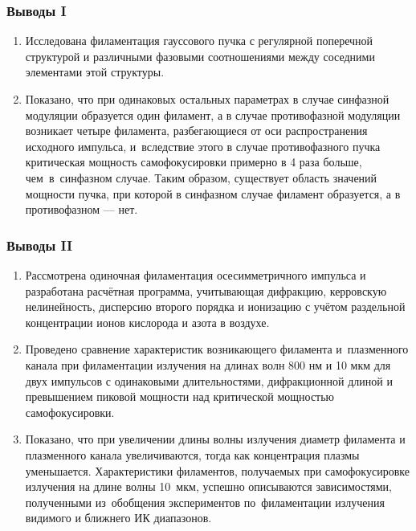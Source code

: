 \documentclass[fullscreen=true,unicode,bookmarks=true]{beamer}
\begin{document}
	\begin{frame}
		\frametitle{Выводы I}
		
        \begin{enumerate}
			\item Исследована филаментация гауссового пучка с регулярной поперечной структурой
                  и различными фазовыми соотношениями между соседними элементами этой структуры.
			\item Показано, что при одинаковых остальных параметрах в случае синфазной модуляции
                  образуется один филамент, а в случае противофазной модуляции
                  возникает четыре филамента, разбегающиеся от оси распространения исходного
                  импульса, и~вследствие этого в случае противофазного пучка критическая
                  мощность самофокусировки примерно в 4 раза больше, чем~в~синфазном случае.
                  Таким образом, существует область значений мощности пучка, при которой
                  в синфазном случае филамент образуется, а в противофазном --- нет.
		\end{enumerate}
	\end{frame}
	
	\begin{frame}
		\frametitle{Выводы II}
		
        \begin{enumerate}
			\item Рассмотрена одиночная филаментация осесимметричного импульса
			      и разработана расчётная программа,
			      учитывающая дифракцию, керровскую нелинейность, дисперсию второго порядка и ионизацию
			      с учётом раздельной концентрации ионов кислорода и азота в воздухе.
			\item Проведено сравнение характеристик возникающего филамента и~плазменного канала при филаментации излучения
			      на длинах волн 800 нм и 10 мкм для двух импульсов с одинаковыми длительностями, дифракционной длиной
			      и превышением пиковой мощности над критической мощностью самофокусировки.
			\item Показано, что при увеличении длины волны излучения диаметр филамента и плазменного канала увеличиваются,
			      тогда как концентрация плазмы уменьшается. Характеристики филаментов, получаемых при самофокусировке излучения
			      на длине волны 10~мкм, успешно описываются зависимостями, полученными из~обобщения экспериментов
			      по~филаментации излучения видимого и ближнего ИК диапазонов.
		\end{enumerate}
	\end{frame}	
\end{document}
